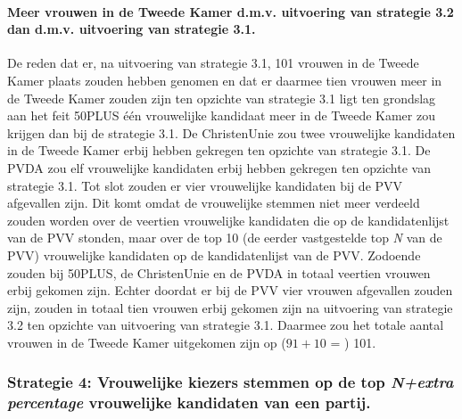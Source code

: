 \paragraph{Meer vrouwen in de Tweede Kamer d.m.v. uitvoering van strategie 3.2 dan d.m.v. uitvoering van strategie 3.1.}
De reden dat er, na uitvoering van strategie 3.1, 101 vrouwen in de Tweede Kamer plaats zouden hebben genomen en dat er daarmee tien vrouwen meer in de Tweede Kamer zouden zijn ten opzichte van strategie 3.1 ligt ten grondslag aan het feit 50PLUS één vrouwelijke kandidaat meer in de Tweede Kamer zou krijgen dan bij de strategie 3.1. 
De ChristenUnie zou twee vrouwelijke kandidaten in de Tweede Kamer erbij hebben gekregen ten opzichte van strategie 3.1. De PVDA zou elf vrouwelijke kandidaten erbij hebben gekregen ten opzichte van strategie 3.1. Tot slot zouden er vier vrouwelijke kandidaten bij de PVV afgevallen zijn. Dit komt omdat de vrouwelijke stemmen niet meer verdeeld zouden worden over de veertien vrouwelijke kandidaten die op de kandidatenlijst van de PVV stonden, maar over de top 10 (de eerder vastgestelde top \textit{N} van de PVV) vrouwelijke kandidaten op de kandidatenlijst van de PVV. Zodoende zouden bij 50PLUS, de ChristenUnie en de PVDA in totaal veertien vrouwen erbij gekomen zijn. Echter doordat er bij de PVV vier vrouwen afgevallen zouden zijn, zouden in totaal tien vrouwen erbij gekomen zijn na uitvoering van strategie 3.2 ten opzichte van uitvoering van strategie 3.1. Daarmee zou het totale aantal vrouwen in de Tweede Kamer uitgekomen zijn op ($91+10$ = ) 101.


\subsubsection{Strategie 4: Vrouwelijke kiezers stemmen op de top \textit{N+extra percentage} vrouwelijke kandidaten van een partij.}

